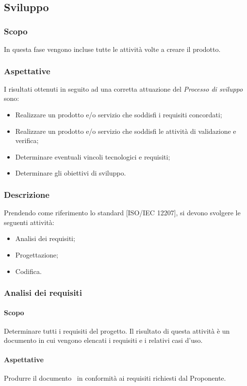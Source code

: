\documentclass[../NormeDiProgetto.tex]{subfiles}
\begin{document}
	\subsection{Sviluppo}
		\subsubsection{Scopo}
			In questa fase vengono incluse tutte le attività volte a creare il prodotto.
		\subsubsection{Aspettative}
			I risultati ottenuti in seguito ad una corretta attuazione del
			\textit{Processo di sviluppo} sono:
			\begin{itemize}
				\item Realizzare un prodotto e/o servizio che soddisfi i requisiti concordati;
				\item Realizzare un prodotto e/o servizio che soddisfi le attività di validazione
				e verifica;
				\item Determinare eventuali vincoli tecnologici e requisiti;
				\item Determinare gli obiettivi di sviluppo.
			\end{itemize}
		\subsubsection{Descrizione}
			Prendendo come riferimento lo standard [ISO/IEC 12207], si devono svolgere le seguenti
			attività:
			\begin{itemize}
				\item Analisi dei requisiti;
				\item Progettazione;
				\item Codifica.
			\end{itemize}
		\subsubsection{Analisi dei requisiti}
			\paragraph{Scopo\\}
				Determinare tutti i requisiti del progetto. Il risultato di questa attività è un
				documento in cui vengono elencati i requisiti e i relativi casi d'uso.
			\paragraph{Aspettative\\}
				Produrre il documento \analisideirequisiti\ in conformità ai requisiti richiesti
				dal Proponente.
\end{document}
